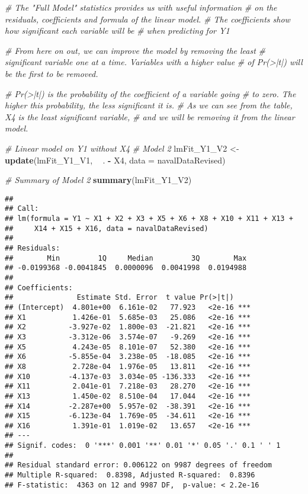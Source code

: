 \documentclass[
]{article}
\newenvironment{Shaded}{\begin{snugshade}}{\end{snugshade}}
\newcommand{\CommentTok}[1]{\textcolor[rgb]{0.56,0.35,0.01}{\textit{#1}}}
\newcommand{\DataTypeTok}[1]{\textcolor[rgb]{0.13,0.29,0.53}{#1}}
\newcommand{\KeywordTok}[1]{\textcolor[rgb]{0.13,0.29,0.53}{\textbf{#1}}}
\newcommand{\NormalTok}[1]{#1}
\newcommand{\OperatorTok}[1]{\textcolor[rgb]{0.81,0.36,0.00}{\textbf{#1}}}
\newcommand{\StringTok}[1]{\textcolor[rgb]{0.31,0.60,0.02}{#1}}
\begin{document}
\begin{Shaded}
\begin{Highlighting}[]
\CommentTok{# The "Full Model" statistics provides us with useful information}
\CommentTok{# on the residuals, coefficients and formula of the linear model.}
\CommentTok{# The coefficients show how significant each variable will be }
\CommentTok{# when predicting for Y1}

\CommentTok{# From here on out, we can improve the model by removing the least}
\CommentTok{# significant variable one at a time. Variables with a higher value}
\CommentTok{# of Pr(>|t|) will be the first to be removed.}

\CommentTok{# Pr(>|t|) is the probability of the coefficient of a variable going}
\CommentTok{# to zero. The higher this probability, the less significant it is.}
\CommentTok{# As we can see from the table, X4 is the least significant variable,}
\CommentTok{# and we will be removing it from the linear model.}

\CommentTok{# Linear model on Y1 without X4}
\CommentTok{# Model 2}
\NormalTok{lmFit_Y1_V2 <-}\StringTok{ }\KeywordTok{update}\NormalTok{(lmFit_Y1_V1, }\OperatorTok{~}\StringTok{ }\NormalTok{. }\OperatorTok{-}\StringTok{ }\NormalTok{X4, }\DataTypeTok{data =}\NormalTok{ navalDataRevised)}

\CommentTok{# Summary of Model 2}
\KeywordTok{summary}\NormalTok{(lmFit_Y1_V2)}
\end{Highlighting}
\end{Shaded}

\begin{verbatim}
## 
## Call:
## lm(formula = Y1 ~ X1 + X2 + X3 + X5 + X6 + X8 + X10 + X11 + X13 + 
##     X14 + X15 + X16, data = navalDataRevised)
## 
## Residuals:
##        Min         1Q     Median         3Q        Max 
## -0.0199368 -0.0041845  0.0000096  0.0041998  0.0194988 
## 
## Coefficients:
##               Estimate Std. Error  t value Pr(>|t|)    
## (Intercept)  4.801e+00  6.161e-02   77.923   <2e-16 ***
## X1           1.426e-01  5.685e-03   25.086   <2e-16 ***
## X2          -3.927e-02  1.800e-03  -21.821   <2e-16 ***
## X3          -3.312e-06  3.574e-07   -9.269   <2e-16 ***
## X5           4.243e-05  8.101e-07   52.380   <2e-16 ***
## X6          -5.855e-04  3.238e-05  -18.085   <2e-16 ***
## X8           2.728e-04  1.976e-05   13.811   <2e-16 ***
## X10         -4.137e-03  3.034e-05 -136.333   <2e-16 ***
## X11          2.041e-01  7.218e-03   28.270   <2e-16 ***
## X13          1.450e-02  8.510e-04   17.044   <2e-16 ***
## X14         -2.287e+00  5.957e-02  -38.391   <2e-16 ***
## X15         -6.123e-04  1.769e-05  -34.611   <2e-16 ***
## X16          1.391e-01  1.019e-02   13.657   <2e-16 ***
## ---
## Signif. codes:  0 '***' 0.001 '**' 0.01 '*' 0.05 '.' 0.1 ' ' 1
## 
## Residual standard error: 0.006122 on 9987 degrees of freedom
## Multiple R-squared:  0.8398, Adjusted R-squared:  0.8396 
## F-statistic:  4363 on 12 and 9987 DF,  p-value: < 2.2e-16
\end{verbatim}
\end{document}

